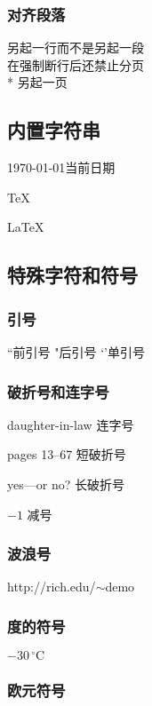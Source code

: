 \documentclass[a4paper,12pt]{article}
\begin{document}
\subsubsection{对齐段落}

另起一行而不是另起一段\\  %
在强制断行后还禁止分页\\* %
另起一页\newpage %

\subsection{内置字符串}

\today 当前日期

\TeX

\LaTeX

\LaTeXe

\subsection{特殊字符和符号}

\subsubsection{引号}

``前引号 \qquad"后引号 \qquad‘’单引号

\subsubsection{破折号和连字号}

daughter-in-law 连字号

pages 13--67 短破折号

yes---or no? 长破折号

$-1$ 减号

\subsubsection{波浪号}

http://rich.edu/$\sim$demo

\subsubsection{度的符号}

$-30\,^{\circ}\mathrm{C}$

\subsubsection{欧元符号}
\end{document}
